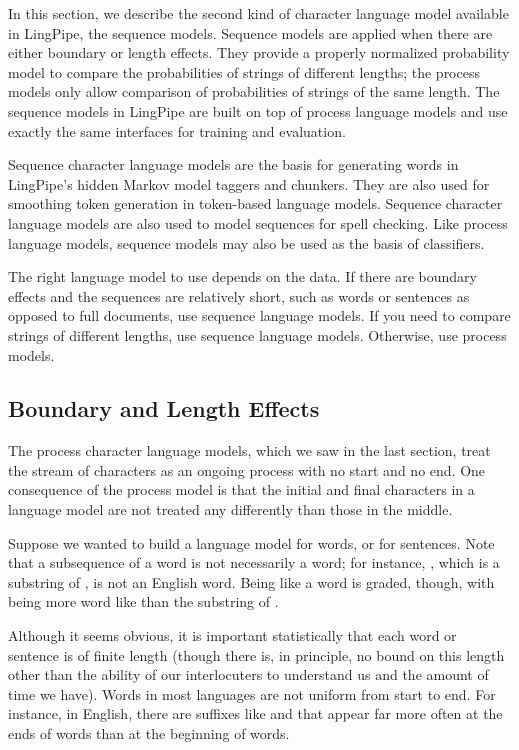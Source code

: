 In this section, we describe the second kind of character language
model available in LingPipe, the sequence models.  Sequence models are
applied when there are either boundary or length effects.  They
provide a properly normalized probability model to compare the
probabilities of strings of different lengths; the process models only
allow comparison of probabilities of strings of the same length.  The
sequence models in LingPipe are built on top of process language
models and use exactly the same interfaces for training and evaluation.

Sequence character language models are the basis for generating words
in LingPipe's hidden Markov model taggers and chunkers.  They are also
used for smoothing token generation in token-based language models.  
Sequence character language models are also used to model
sequences for spell checking.  Like process language models, sequence
models may also be used as the basis of classifiers.  \

The right language model to use depends on the data.  If there are
boundary effects and the sequences are relatively short, such as words
or sentences as opposed to full documents, use sequence language
models.  If you need to compare strings of different lengths, use
sequence language models.  Otherwise, use process models.

\subsection{Boundary and Length Effects}

The process character language models, which we saw in the last
section, treat the stream of characters as an ongoing process with no
start and no end.  One consequence of the process model is that the
initial and final characters in a language model are not treated any
differently than those in the middle. 

Suppose we wanted to build a language model for words, or for
sentences.  Note that a subsequence of a word is not necessarily a
word; for instance, , which is a substring of
, is not an English word.  Being like a
word is graded, though, with  being more word
like than the substring  of
.

Although it seems obvious, it is important statistically that each
word or sentence is of finite length (though there is, in principle,
no bound on this length other than the ability of our interlocuters to
understand us and the amount of time we have).  Words in most
languages are not uniform from start to end.  For instance, in
English, there are suffixes like  and
 that appear far more often at the ends of words than
at the beginning of words.  

